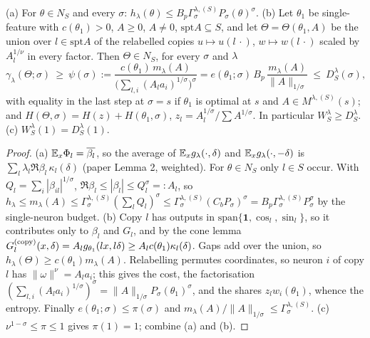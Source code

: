 \documentclass[11pt]{article}
\theoremstyle{remark}\newtheorem{remark}[theorem]{Remark}
\begin{document}
\begin{lemma}\label{l:bounds}
(a) For $\theta\in N_S$ and every $\sigma$: $h_\lambda(\theta)\le B_p\Gamma^{\lambda,(S)}_\sigma P_\sigma(\theta)^\sigma$.
(b) Let $\theta_1$ be single-feature with $c(\theta_1)>0$, $A\ge0$, $A\ne0$, $\mathrm{spt}A\subseteq S$, and let
$\Theta=\Theta(\theta_1,A)$ be the union over $l\in\mathrm{spt}A$ of the relabelled copies $u\mapsto u(l\,\cdot)$,
$w\mapsto w(l\,\cdot)$ scaled by $A_l^{1/\nu}$ in every factor. Then $\Theta\in N_S$, for every $\sigma$ and $\lambda$
\[\gamma_\lambda(\Theta;\sigma)\ \ge\ \psi(\sigma):=\frac{c(\theta_1)\,m_\lambda(A)}{\big(\sum_{l,i}(A_la_i)^{1/\sigma}\big)^\sigma}
=e(\theta_1;\sigma)\,B_p\,\frac{m_\lambda(A)}{\|A\|_{1/\sigma}}\ \le\ D^\lambda_S(\sigma),\]
with equality in the last step at $\sigma=s$ if $\theta_1$ is optimal at $s$ and $A\in M^{\lambda,(S)}(s)$; and
$H(\Theta,\sigma)=H(z)+H(\theta_1,\sigma)$, $z_l=A_l^{1/\sigma}/\sum A^{1/\sigma}$. In particular $W^\lambda_S\ge D^\lambda_S$.
(c) $W^\lambda_S(1)=D^\lambda_S(1)$.
\end{lemma}
\begin{proof}
(a) $\mathbb E_x\Phi_l=\overline{\beta_l}$, so the average of $\mathbb E_xg_\lambda(\cdot,\delta)$ and $\mathbb E_xg_\lambda(\cdot,-\delta)$ is
$\sum_l\lambda_l\Re\beta_l\,\kappa_l(\delta)$ (paper Lemma 2, weighted). For $\theta\in N_S$ only $l\in S$ occur. With
$Q_l=\sum_i|\beta_{il}|^{1/\sigma}$, $\Re\beta_l\le|\beta_l|\le Q_l^\sigma=:A_l$, so
$h_\lambda\le m_\lambda(A)\le\Gamma^{\lambda,(S)}_\sigma(\sum_lQ_l)^\sigma\le\Gamma^{\lambda,(S)}_\sigma(C_bP_\sigma)^\sigma
=B_p\Gamma^{\lambda,(S)}_\sigma P_\sigma^\sigma$ by the single-neuron budget.
(b) Copy $l$ has outputs in $\mathrm{span}\{\mathbf1,\cos_l,\sin_l\}$, so it contributes only to $\beta_l$ and $G_l$, and by the
cone lemma $G_l^{(\rm copy)}(x,\delta)=A_lg_{\theta_1}(lx,l\delta)\ge A_lc(\theta_1)\kappa_l(\delta)$. Gaps add over the union,
so $h_\lambda(\Theta)\ge c(\theta_1)m_\lambda(A)$. Relabelling permutes coordinates, so neuron $i$ of copy $l$ has
$\|\omega\|^\nu=A_la_i$; this gives the cost, the factorisation
$(\sum_{l,i}(A_la_i)^{1/\sigma})^\sigma=\|A\|_{1/\sigma}P_\sigma(\theta_1)^\sigma$, and the shares $z_lw_i(\theta_1)$, whence the entropy.
Finally $e(\theta_1;\sigma)\le\pi(\sigma)$ and $m_\lambda(A)/\|A\|_{1/\sigma}\le\Gamma^{\lambda,(S)}_\sigma$.
(c) $\nu^{1-\sigma}\le\pi\le1$ gives $\pi(1)=1$; combine (a) and (b).
\end{proof}
\end{document}
